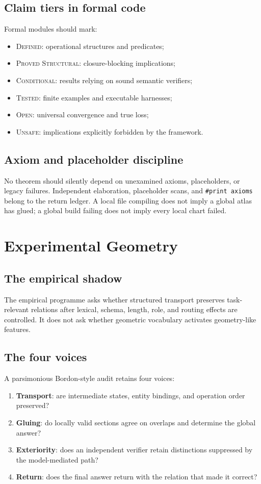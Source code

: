\documentclass[12pt,openany]{book}
\theoremstyle{remark}
\begin{document}
\section{Claim tiers in formal code}
Formal modules should mark:
\begin{itemize}
\item \textsc{Defined}: operational structures and predicates;
\item \textsc{Proved Structural}: closure-blocking implications;
\item \textsc{Conditional}: results relying on sound semantic verifiers;
\item \textsc{Tested}: finite examples and executable harnesses;
\item \textsc{Open}: universal convergence and true loss;
\item \textsc{Unsafe}: implications explicitly forbidden by the framework.
\end{itemize}

\section{Axiom and placeholder discipline}
No theorem should silently depend on unexamined axioms, placeholders, or legacy failures. Independent elaboration, placeholder scans, and \texttt{\#print axioms} belong to the return ledger. A local file compiling does not imply a global atlas has glued; a global build failing does not imply every local chart failed.

\chapter{Experimental Geometry}
\label{ch:experiments}

\section{The empirical shadow}
The empirical programme asks whether structured transport preserves task-relevant relations after lexical, schema, length, role, and routing effects are controlled. It does not ask whether geometric vocabulary activates geometry-like features.

\section{The four voices}
A parsimonious Bordon-style audit retains four voices:
\begin{enumerate}
\item \textbf{Transport}: are intermediate states, entity bindings, and operation order preserved?
\item \textbf{Gluing}: do locally valid sections agree on overlaps and determine the global answer?
\item \textbf{Exteriority}: does an independent verifier retain distinctions suppressed by the model-mediated path?
\item \textbf{Return}: does the final answer return with the relation that made it correct?
\end{enumerate}
\end{document}
